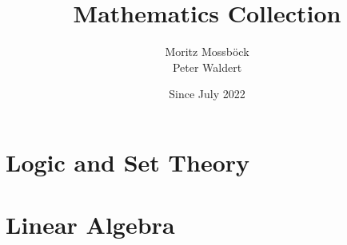 \documentclass{report}
\author{Moritz Mossböck \\ Peter Waldert}
\title{\textbf{Mathematics Collection}}
\date{Since July 2022}
\begin{document}
    \pagestyle{empty}
    \begin{titlepage}
        \maketitle
    \end{titlepage}

    

    \pagestyle{fancy}
    \tableofcontents

    \newpage
    
    \chapter{Logic and Set Theory}\label{chp:logic_set}
    
    

    \chapter{Linear Algebra}\label{chp:linear_algebra}
    \thispagestyle{empty}
    
\end{document}
